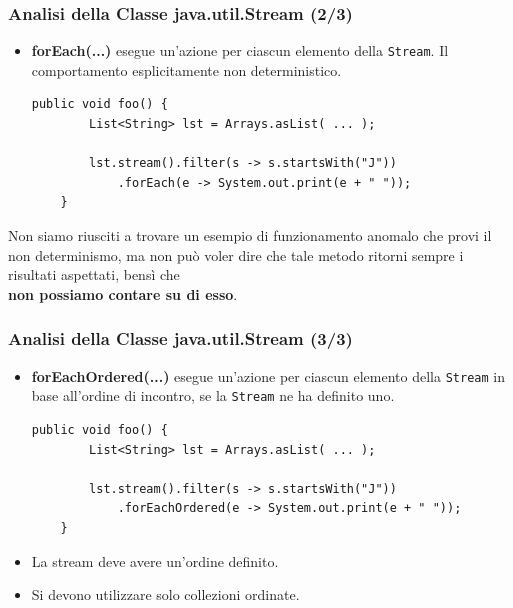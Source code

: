 \documentclass[]{beamer}
\begin{document}
\begin{frame}[fragile]
\frametitle{Analisi della Classe java.util.Stream (2/3)}
\begin{block}{}
	\begin{itemize}
		\item \textbf{forEach(...)} esegue un'azione per ciascun elemento della \lstinline|Stream|. Il comportamento esplicitamente non deterministico.
		
		\begin{lstlisting}[breaklines=true]
	public void foo() {
		List<String> lst = Arrays.asList( ... );
		
		lst.stream().filter(s -> s.startsWith("J"))
			.forEach(e -> System.out.print(e + " "));
	}
		\end{lstlisting}
	\end{itemize}
\end{block}
\begin{center}
	Non siamo riusciti a trovare un esempio di funzionamento anomalo che provi il non determinismo, ma non può voler dire che tale metodo ritorni sempre i risultati aspettati, bensì che \\\textbf{non possiamo contare su di esso}.
\end{center}
\end{frame}

\begin{frame}[fragile]
\frametitle{Analisi della Classe java.util.Stream (3/3)}
\begin{block}{}
	\begin{itemize}
		\item \textbf{forEachOrdered(...)} esegue un'azione per ciascun elemento della \lstinline|Stream| in base all'ordine di incontro, se la \lstinline|Stream| ne ha definito uno.
		
		\begin{lstlisting}[breaklines=true]
	public void foo() {
		List<String> lst = Arrays.asList( ... );
		
		lst.stream().filter(s -> s.startsWith("J"))
			.forEachOrdered(e -> System.out.print(e + " "));
	}
		\end{lstlisting}
	\end{itemize}
\end{block}
\begin{itemize}
	\item La stream deve avere un'ordine definito.
	\item Si devono utilizzare solo collezioni ordinate.
\end{itemize}
\end{frame}
\end{document}
